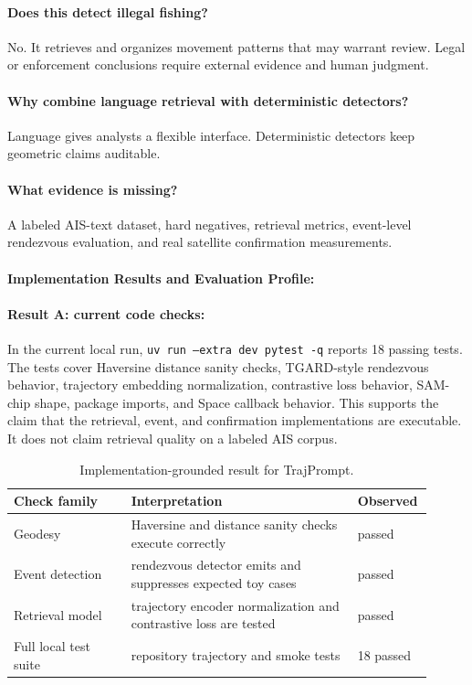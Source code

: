 \documentclass{article}
\begin{document}
\paragraph{Does this detect illegal fishing?}
No. It retrieves and organizes movement patterns that may warrant review. Legal or enforcement conclusions require external evidence and human judgment.

\paragraph{Why combine language retrieval with deterministic detectors?}
Language gives analysts a flexible interface. Deterministic detectors keep geometric claims auditable.

\paragraph{What evidence is missing?}
A labeled AIS-text dataset, hard negatives, retrieval metrics, event-level rendezvous evaluation, and real satellite confirmation measurements.

\paragraph{Implementation Results and Evaluation Profile:}

\paragraph{Result A: current code checks:}

In the current local run, \texttt{uv run --extra dev pytest -q} reports 18 passing tests. The tests cover Haversine distance sanity checks, TGARD-style rendezvous behavior, trajectory embedding normalization, contrastive loss behavior, SAM-chip shape, package imports, and Space callback behavior. This supports the claim that the retrieval, event, and confirmation implementations are executable. It does not claim retrieval quality on a labeled AIS corpus.

\begin{table}[t]
\centering
\caption{Implementation-grounded result for TrajPrompt.}
\begin{tabular}{@{}p{0.27\linewidth}p{0.52\linewidth}p{0.12\linewidth}@{}}
\toprule
\textbf{Check family} & \textbf{Interpretation} & \textbf{Observed}\\
\midrule
Geodesy & Haversine and distance sanity checks execute correctly & passed\\
Event detection & rendezvous detector emits and suppresses expected toy cases & passed\\
Retrieval model & trajectory encoder normalization and contrastive loss are tested & passed\\
Full local test suite & repository trajectory and smoke tests & 18 passed\\
\bottomrule
\end{tabular}
\end{table}
\end{document}
